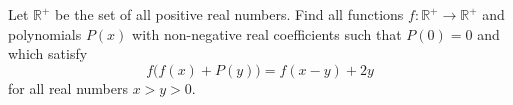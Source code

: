 \begin{problem}
    Let \( \mathbb{R}^+ \) be the set of all positive real numbers. Find all functions \( f : \mathbb{R}^+ \to \mathbb{R}^+ \) and polynomials \( P\left(x\right) \) with non-negative real coefficients such that \( P\left(0\right)=0 \) and which satisfy
    \[
        f\bigl(f\left(x\right) + P\left(y\right)\bigr) = f\left(x - y\right) + 2y
    \]
    for all real numbers \( x > y > 0 \).
\end{problem}
